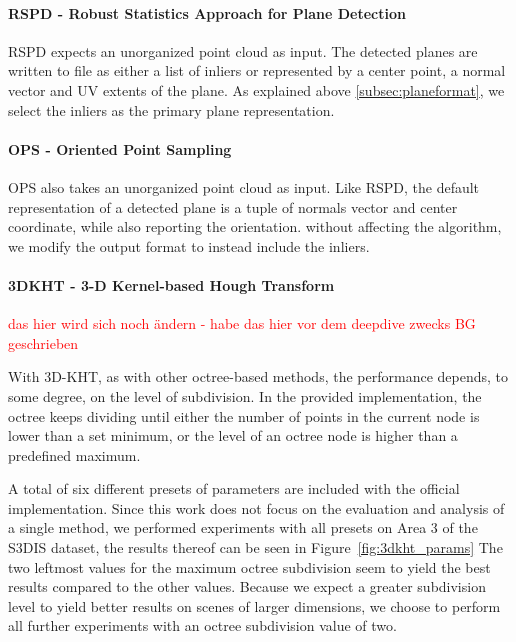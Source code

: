 \documentclass[main.tex]{subfiles}
\begin{document}



\paragraph{RSPD - Robust Statistics Approach for Plane Detection}
RSPD expects an unorganized point cloud as input. The detected planes are written to file as either a list of inliers or
represented by a center point, a normal vector and UV extents of the plane.
As explained above \ref{subsec:planeformat}, we select the inliers as the primary plane representation.

\paragraph{OPS - Oriented Point Sampling}
OPS also takes an unorganized point cloud as input. Like RSPD, the default representation of a detected plane is
a tuple of normals vector and center coordinate, while also reporting the orientation.
without affecting the algorithm, we modify the output format to instead include the inliers.

\paragraph{3DKHT - 3-D Kernel-based Hough Transform}

\textcolor{red}{das hier wird sich noch ändern - habe das hier vor dem deepdive zwecks BG geschrieben}

With 3D-KHT, as with other octree-based methods, the performance depends, to some degree, on the level of subdivision.
In the provided implementation, the octree keeps dividing until either the number of points in the current node is lower than a set minimum, or the
level of an octree node is higher than a predefined maximum.

A total of six different presets of parameters are included with the official implementation.
Since this work does not focus on the evaluation and analysis of a single method, we performed experiments with all presets on Area 3 of the S3DIS\cite{armeni_cvpr16} dataset, the
results thereof can be seen in Figure~\ref{fig:3dkht_params}
The two leftmost values for the maximum octree subdivision seem to yield the best results compared to the other values.
Because we expect a greater subdivision level to yield better results on scenes of larger dimensions, we choose to perform
all further experiments with an octree subdivision value of two.
\end{document}
